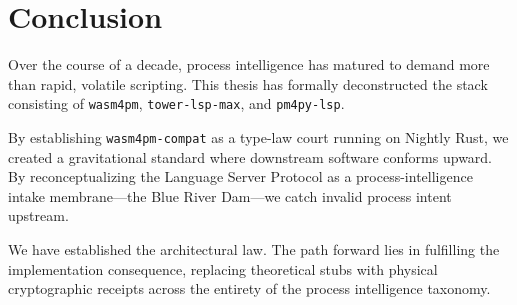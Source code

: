 
\chapter{Conclusion}
Over the course of a decade, process intelligence has matured to demand more than rapid, volatile scripting. This thesis has formally deconstructed the stack consisting of \texttt{wasm4pm}, \texttt{tower-lsp-max}, and \texttt{pm4py-lsp}.

By establishing \texttt{wasm4pm-compat} as a type-law court running on Nightly Rust, we created a gravitational standard where downstream software conforms upward. By reconceptualizing the Language Server Protocol as a process-intelligence intake membrane—the Blue River Dam—we catch invalid process intent upstream. 

We have established the architectural law. The path forward lies in fulfilling the implementation consequence, replacing theoretical stubs with physical cryptographic receipts across the entirety of the process intelligence taxonomy.
